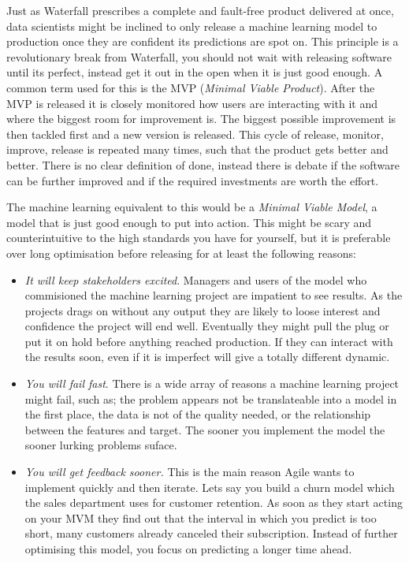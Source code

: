 \documentclass[]{book}
\providecommand{\tightlist}{%
  \setlength{\itemsep}{0pt}\setlength{\parskip}{0pt}}
\begin{document}
Just as Waterfall prescribes a complete and fault-free product delivered at once, data scientists might be inclined to only release a machine learning model to production once they are confident its predictions are spot on. This principle is a revolutionary break from Waterfall, you should not wait with releasing software until its perfect, instead get it out in the open when it is just good enough. A common term used for this is the MVP (\emph{Minimal Viable Product}). After the MVP is released it is closely monitored how users are interacting with it and where the biggest room for improvement is. The biggest possible improvement is then tackled first and a new version is released. This cycle of release, monitor, improve, release is repeated many times, such that the product gets better and better. There is no clear definition of done, instead there is debate if the software can be further improved and if the required investments are worth the effort.

The machine learning equivalent to this would be a \emph{Minimal Viable Model}, a model that is just good enough to put into action. This might be scary and counterintuitive to the high standards you have for yourself, but it is preferable over long optimisation before releasing for at least the following reasons:

\begin{itemize}
\tightlist
\item
  \emph{It will keep stakeholders excited}. Managers and users of the model who commisioned the machine learning project are impatient to see results. As the projects drags on without any output they are likely to loose interest and confidence the project will end well. Eventually they might pull the plug or put it on hold before anything reached production. If they can interact with the results soon, even if it is imperfect will give a totally different dynamic.
\item
  \emph{You will fail fast}. There is a wide array of reasons a machine learning project might fail, such as; the problem appears not be translateable into a model in the first place, the data is not of the quality needed, or the relationship between the features and target. The sooner you implement the model the sooner lurking problems suface.
\item
  \emph{You will get feedback sooner.} This is the main reason Agile wants to implement quickly and then iterate. Lets say you build a churn model which the sales department uses for customer retention. As soon as they start acting on your MVM they find out that the interval in which you predict is too short, many customers already canceled their subscription. Instead of further optimising this model, you focus on predicting a longer time ahead.
\end{itemize}
\end{document}
